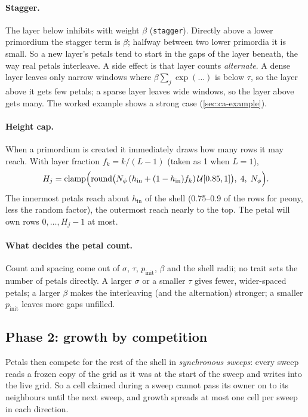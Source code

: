 \paragraph{Stagger.} The layer below inhibits with weight $\beta$
(\texttt{stagger}). Directly above a lower primordium the stagger term is
$\beta$; halfway between two lower primordia it is small. So a new layer's
petals tend to start in the gaps of the layer beneath, the way real petals
interleave. A side effect is that layer counts \emph{alternate}. A dense
layer leaves only narrow windows where $\beta \sum_j \exp(\dots)$ is below
$\tau$, so the layer above it gets few petals; a sparse layer leaves wide
windows, so the layer above gets many. The worked example shows a strong case
(\cref{sec:ca-example}).

\paragraph{Height cap.} When a primordium is created it immediately draws
how many rows it may reach. With layer fraction $f_k = k/(L-1)$ (taken as 1
when $L=1$),
\[
  H_j = \operatorname{clamp}\Bigl(\operatorname{round}\bigl(N_\phi\,(h_{\mathrm{in}} + (1-h_{\mathrm{in}}) f_k)\,\mathcal{U}[0.85, 1]\bigr),\; 4,\; N_\phi\Bigr).
\]
The innermost petals reach about $h_{\mathrm{in}}$ of the shell (0.75--0.9 of
the rows for peony, less the random factor), the outermost reach nearly to the
top. The petal will own rows $0,\dots,H_j-1$ at most.

\paragraph{What decides the petal count.} Count and spacing come out of
$\sigma$, $\tau$, $p_{\mathrm{init}}$, $\beta$ and the shell radii; no trait
sets the number of petals directly. A larger $\sigma$ or a smaller $\tau$
gives fewer, wider-spaced petals; a larger $\beta$ makes the interleaving (and
the alternation) stronger; a smaller $p_{\mathrm{init}}$ leaves more gaps
unfilled.

\subsection{Phase 2: growth by competition}\label{sec:ca-growth}
Petals then compete for the rest of the shell in \emph{synchronous sweeps}:
every sweep reads a frozen copy of the grid as it was at the start of the
sweep and writes into the live grid. So a cell claimed during a sweep cannot
pass its owner on to its neighbours until the next sweep, and growth spreads
at most one cell per sweep in each direction.

